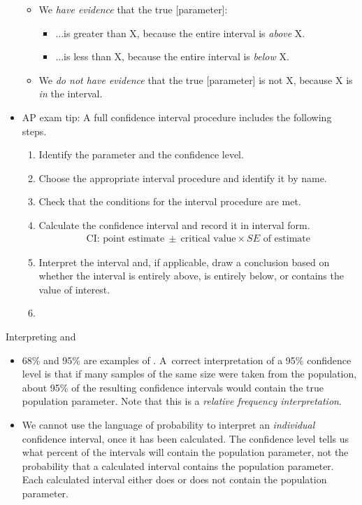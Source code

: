 \begin{itemize}
\begin{itemize}\vspace{-1mm}
\setlength{\itemsep}{0mm}
\item We \emph{have evidence} that the true [parameter]:
\begin{itemize}\vspace{-1mm}
\setlength{\itemsep}{0mm}
\item[]  ...is greater than X, because the entire interval is \emph{above} X.
\item[] ...is less than X, because the entire interval is \emph{below} X.
\end{itemize}
\item We \emph{do not have evidence} that the true [parameter] is not  X, because X is \emph{in} the interval.
\end{itemize}

\item AP exam tip:  A full confidence interval procedure includes the following steps. \vspace{-1mm}
\begin{enumerate}
\setlength{\itemsep}{0mm}
\item {}  Identify the parameter and the confidence level.
\item  {}  Choose the appropriate interval procedure and identify it by name.
\item  {}  Check that the conditions for the interval procedure are met. 
\item {} Calculate the confidence interval and record it in interval form.  
\begin{align*}
\text{CI:  point estimate}\ \pm\  \text{critical value}\times SE \text{ of estimate}
\end{align*}
\item {} Interpret the interval and, if applicable, draw a conclusion based on whether the interval is entirely above, is entirely below, or contains the value of interest.
\item[]
\end{enumerate}
\end{itemize}
Interpreting  and 
\begin{itemize}
\item 68\% and 95\% are examples of .  A~correct interpretation of a 95\% confidence level is that if many samples of the same size were taken from the population, about 95\% of the resulting confidence intervals would contain the true population parameter.  Note that this is a \emph{relative frequency interpretation}.  

\item We cannot use the language of probability to interpret an \emph{individual} confidence interval, once it has been calculated.  The confidence level tells us what percent of the intervals will contain the population parameter, not the probability that a calculated interval contains the population parameter.  Each calculated interval either does or does not contain the population parameter.  


\end{itemize}

